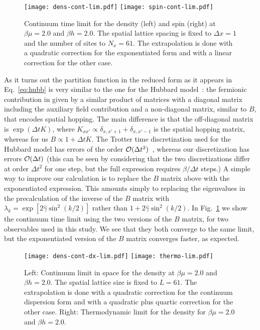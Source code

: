 \documentclass[aps,eqsecnum,amsmath,onecolumn,groupedaddress,superscriptaddress,notitlepage,nofootinbib]{revtex4-1}
\begin{document}
\begin{figure}[t]
\texttt{[image: dens-cont-lim.pdf]}
\texttt{[image: spin-cont-lim.pdf]}
\caption{Continuum time limit for the density (left) and spin (right) at $\beta \mu = 2.0$ and $\beta h =2.0$. The spatial lattice spacing is fixed to $\Delta x=1$ and the number of sites to $N_x=61$. The extrapolation is done with a quadratic correction for the exponentiated form and with a linear correction for the other case.}
\label{fig:cont-dt-lim}
\end{figure}

As it turns out the partition function in the reduced form as it appears in 
Eq.~\ref{eq:hubb} is very similar to the one for the Hubbard model~\cite{White:1989zz}: 
the fermionic contribution in given by a similar product of matrices with a diagonal 
matrix including the auxiliary field contribution and a non-diagonal matrix, similar to $B$, 
that encodes spatial hopping. The main difference is that the off-diagonal matrix
is $\exp(\Delta t K)$, where $K_{xx'}\propto \delta_{x,x'+1}+\delta_{x,x'-1}$ is the spatial
hopping matrix, whereas for us $B\propto 1+\Delta t K$. 
The Trotter time discretization used for the Hubbard model has errors of the order 
${\cal O}(\Delta t^2)$~\cite{White:1989zz,PhysRevB.33.6271},
whereas our discretization has errors ${\cal O}(\Delta t)$ (this can be seen by considering that
the two discretizations differ at order $\Delta t^2$ for one step, but the full expression 
requires $\beta/\Delta t$ steps.) A simple way to improve our calculation is to replace
the $B$ matrix above with the exponentiated expression. This amounts simply to replacing
the eigenvalues in the precalculation of the inverse of the $B$ matrix with 
$\lambda_k=\exp[2\hat\gamma \sin^2(k/2)]$ rather than $1+ 2\hat\gamma \sin^2(k/2)$.
In Fig.~\ref{fig:cont-dt-lim} we show the continuum time limit using the two versions of the $B$
matrix, for two observables used in this study. We see that they both converge to the same limit,
but the exponentiated version of the $B$ matrix converges faster, as expected.

\begin{figure}[t]
\texttt{[image: dens-cont-dx-lim.pdf]}
\texttt{[image: thermo-lim.pdf]}
\caption{Left: Continuum limit in space for the density at $\beta \mu = 2.0$ and $\beta h =2.0$. The spatial lattice size is fixed to $L=61$. The extrapolation is done with a quadratic correction for the continuum dispersion form and with a quadratic plus quartic correction for the other case. Right: Thermodynamic limit for the density for $\beta \mu = 2.0$ and $\beta h =2.0$.}
\label{fig:cont-dx-thermo-lim}
\end{figure}
\end{document}
